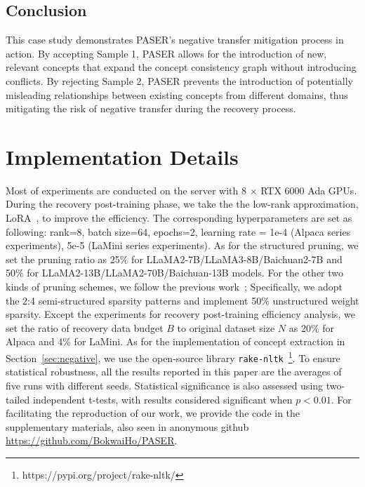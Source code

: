 \subsection{Conclusion}
This case study demonstrates PASER's negative transfer mitigation process in action. By accepting Sample 1, PASER allows for the introduction of new, relevant concepts that expand the concept consistency graph without introducing conflicts. By rejecting Sample 2, PASER prevents the introduction of potentially misleading relationships between existing concepts from different domains, thus mitigating the risk of negative transfer during the recovery process.

\section{Implementation Details}
\label{appendix: implementation}
Most of experiments are conducted on the server with 8 $\times$ RTX 6000 Ada GPUs. During the recovery post-training phase, we take the the low-rank approximation, LoRA~\citep{hulora}, to improve the efficiency. The corresponding hyperparameters are set as following: rank=8, batch size=64, epochs=2, learning rate = 1e-4 (Alpaca series experiments), 5e-5 (LaMini series experiments). As for the structured pruning, we set the pruning ratio as 25\% for LLaMA2-7B/LLaMA3-8B/Baichuan2-7B and 50\% for LLaMA2-13B/LLaMA2-70B/Baichuan-13B models. For the other two kinds of pruning schemes, we follow the previous work~\citep{sparsegpt2023elias}; Specifically, we adopt the 2:4 semi-structured sparsity patterns and implement 50\% unstructured weight sparsity. Except the experiments for recovery post-training efficiency analysis, we set the ratio of recovery data budget $B$ to original dataset size $N$ as 20\% for Alpaca and 4\% for LaMini. As for the implementation of concept extraction in Section~\ref{sec:negative}, we use the open-source library \texttt{rake-nltk}~\footnote{https://pypi.org/project/rake-nltk/}. To ensure statistical robustness, all the results reported in this paper are the averages of five runs with different seeds. Statistical significance is also assessed using two-tailed independent t-tests, with results considered significant when $p < 0.01$. For facilitating the reproduction of our work, we provide the code in the supplementary materials, also seen in anonymous github \url{https://github.com/BokwaiHo/PASER}.

